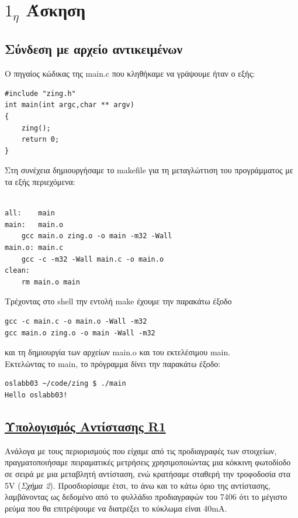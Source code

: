 \documentclass[a4paper,10pt]{article} \usepackage{anysize}
\begin{document}


\section*{$1_η$ Άσκηση} \setcounter{section}{1}
\subsection{Σύνδεση με αρχείο αντικειμένων} Ο πηγαίος κώδικας της main.c που
κληθήκαμε να γράψουμε ήταν ο εξής:

\begin{verbatim}
#include "zing.h"
int main(int argc,char ** argv)
{
	zing();
	return 0;
}
\end{verbatim}

Στη συνέχεια δημιουργήσαμε το makefile για  τη μεταγλώττιση του προγράμματος
με τα εξής περιεχόμενα:

\begin{verbatim}

all:	main
main:	main.o
	gcc main.o zing.o -o main -m32 -Wall
main.o:	main.c
	gcc -c -m32 -Wall main.c -o main.o
clean:
	rm main.o main

\end{verbatim}
Τρέχοντας στο shell την εντολή make έχουμε την παρακάτω έξοδο
\begin{verbatim}
gcc -c main.c -o main.o -Wall -m32
gcc main.o zing.o -o main -Wall -m32
\end{verbatim}
και τη δημιουργία των αρχείων main.o και του εκτελέσιμου main.\\
Εκτελώντας το main, το πρόγραμμα δίνει την παρακάτω έξοδο:
\begin{verbatim}
oslabb03 ~/code/zing $ ./main
Hello oslabb03!
\end{verbatim}


\pagebreak 
\subsection*{\textnormal{\underline{Υπολογισμός Αντίστασης R1}}}
Ανάλογα με τους περιορισμούς που είχαμε από τις προδιαγραφές των στοιχείων,
πραγματοποιήσαμε πειραματικές μετρήσεις χρησιμοποιώντας μια κόκκινη φωτοδίοδο
σε σειρά με μια μεταβλητή αντίσταση, ενώ κρατήσαμε σταθερή την τροφοδοσία στα
5V (\textit{Σχήμα 2}). Προσδιορίσαμε έτσι, το άνω και το κάτω όριο της
αντίστασης, λαμβάνοντας ως δεδομένο από το φυλλάδιο προδιαγραφών του 7406 ότι
το μέγιστο ρεύμα που θα επιτρέψουμε να διατρέξει το κύκλωμα είναι 40mA. 
 
\end{document}
